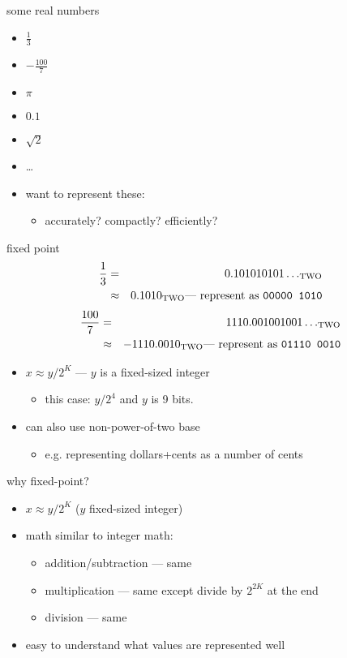 \begin{frame}{some real numbers}
\begin{itemize}
\item $\frac{1}{3}$
\item $-\frac{100}{7}$
\item $\pi$
\item $0.1$
\item $\sqrt{2}$
\item \ldots
\vspace{.5cm}
\item want to represent these:
    \begin{itemize}
    \item accurately? compactly? efficiently?
    \end{itemize}
\end{itemize}
\end{frame}

\begin{frame}{fixed point}
\begin{eqnarray*}
\frac{1}{3} &=& 0.101010101\ldots_\text{TWO}  \\\
            &\approx& 0.1010_\text{TWO} \text{--- represent as {\tt 00000 1010}} \\
\end{eqnarray*}
\begin{eqnarray*}
\frac{100}{7} &=& 1110.001001001\ldots_\text{TWO}  \\\
            &\approx& -1110.0010_\text{TWO} \text{--- represent as {\tt 01110 0010}} \\
\end{eqnarray*}
\begin{itemize}
\item<2-> $x \approx y/2^K$ --- $y$ is a fixed-sized integer
\begin{itemize}
    \item this case: $y/2^4$ and $y$ is 9 bits.
\end{itemize}
\item<3-> can also use non-power-of-two base
    \begin{itemize}
    \item e.g. representing dollars+cents as a number of cents
    \end{itemize}
\end{itemize}
\end{frame}

\begin{frame}{why fixed-point?}
\begin{itemize}
\item $x \approx y/2^K$ ($y$ fixed-sized integer)
\item math similar to integer math:
    \begin{itemize}
    \item addition/subtraction --- same
    \item multiplication --- same except divide by $2^{2K}$ at the end
    \item division --- same
    \end{itemize}
\item easy to understand what values are represented well
\end{itemize}
\end{frame}

